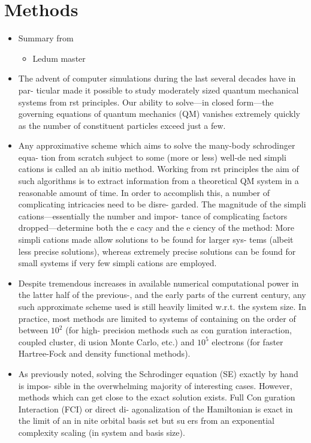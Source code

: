 \documentclass[twoside,english]{uiofysmaster}
\begin{document}
\section{Methods}
\begin{itemize}
	\item Summary from
	\begin{itemize}
			\item Ledum master \cite{Ledum2017}
	\end{itemize}
	\item The advent of computer simulations during the last several decades have in par- ticular made it possible to study moderately sized quantum mechanical systems from  rst principles. Our ability to solve—in closed form—the governing equations of quantum mechanics (QM) vanishes extremely quickly as the number of constituent particles exceed just a few.
	\item Any approximative scheme which aims to solve the many-body schrodinger equa- tion from scratch subject to some (more or less) well-de ned simpli cations is called an ab initio method. Working from  rst principles the aim of such algorithms is to extract information from a theoretical QM system in a reasonable amount of time. In order to accomplish this, a number of complicating intricacies need to be disre- garded. The magnitude of the simpli cations—essentially the number and impor- tance of complicating factors dropped—determine both the e cacy and the e ciency of the method: More simpli cations made allow solutions to be found for larger sys- tems (albeit less precise solutions), whereas extremely precise solutions can be found for small systems if very few simpli cations are employed.
	\item Despite tremendous increases in available numerical computational power in the latter half of the previous-, and the early parts of the current century, any such approximate scheme used is still heavily limited w.r.t. the system size. In practice, most methods are limited to systems of containing on the order of between $10^2$ (for high- precision methods such as con guration interaction, coupled cluster, di usion Monte Carlo, etc.) and $10^5$ electrons (for faster Hartree-Fock and density functional methods).
	\cite{Hu2015} \cite{VandeVondele2012} \cite{Bowler2010}
	\item As previously noted, solving the Schrodinger equation (SE) exactly by hand is impos- sible in the overwhelming majority of interesting cases. However, methods which can get close to the exact solution exists. Full Con guration Interaction (FCI) or direct di- agonalization of the Hamiltonian is exact in the limit of an in nite orbital basis set but su ers from an exponential complexity scaling (in system and basis size). 

\end{itemize}
\end{document}
